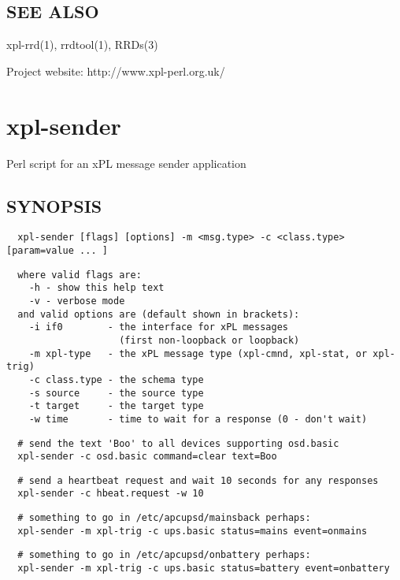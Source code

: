 \documentclass[12pt,a4paper]{article}
\begin{document}
\subsection*{SEE ALSO\label{xpl-rrd-graphs_SEE_ALSO}}


xpl-rrd(1), rrdtool(1), RRDs(3)



Project website: http://www.xpl-perl.org.uk/

\newpage
\section{xpl-sender\label{xpl-sender}}


Perl script for an xPL message sender application

\subsection*{SYNOPSIS\label{xpl-sender_SYNOPSIS}}
\begin{verbatim}
  xpl-sender [flags] [options] -m <msg.type> -c <class.type> [param=value ... ]
\end{verbatim}
\begin{verbatim}
  where valid flags are:
    -h - show this help text
    -v - verbose mode
  and valid options are (default shown in brackets):
    -i if0        - the interface for xPL messages
                    (first non-loopback or loopback)
    -m xpl-type   - the xPL message type (xpl-cmnd, xpl-stat, or xpl-trig)
    -c class.type - the schema type
    -s source     - the source type
    -t target     - the target type
    -w time       - time to wait for a response (0 - don't wait)
\end{verbatim}
\begin{verbatim}
  # send the text 'Boo' to all devices supporting osd.basic
  xpl-sender -c osd.basic command=clear text=Boo
\end{verbatim}
\begin{verbatim}
  # send a heartbeat request and wait 10 seconds for any responses
  xpl-sender -c hbeat.request -w 10
\end{verbatim}
\begin{verbatim}
  # something to go in /etc/apcupsd/mainsback perhaps:
  xpl-sender -m xpl-trig -c ups.basic status=mains event=onmains
\end{verbatim}
\begin{verbatim}
  # something to go in /etc/apcupsd/onbattery perhaps:
  xpl-sender -m xpl-trig -c ups.basic status=battery event=onbattery
\end{verbatim}
\end{document}
